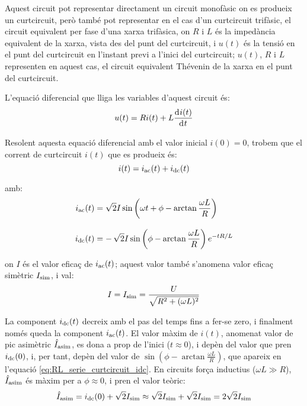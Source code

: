 Aquest circuit pot representar directament un circuit monofàsic on es produeix un curtcircuit, però també pot representar en el cas d'un curtcircuit trifàsic,  el circuit equivalent per fase d'una xarxa trifàsica, on $R$ i $L$ és la impedància equivalent de la xarxa, vista des del punt del curtcircuit, i $u(t)$ és la tensió en el punt del curtcircuit en l'instant previ a l'inici del curtcircuit; $u(t)$,  $R$ i $L$ representen en aquest cas, el circuit equivalent Thévenin de la xarxa en el punt del curtcircuit.

\begin{center}
    
    \label{pic:RL_serie_curtcircuit}
\end{center}

L'equació diferencial que lliga les variables d'aquest circuit és:
\begin{equation}
    u(t) = R i(t) + L \deriv{i(t)}{t}
\end{equation}

Resolent aquesta equació diferencial amb el valor inicial $i(0)=0$, trobem que el corrent de curtcircuit $i(t)$  que es produeix  és:
\begin{equation}
    i(t) = i_\mathrm{ac}(t) + i_\mathrm{dc}(t)
    \label{eq:RL_serie_curtcircuit_icc}
\end{equation}

amb:
\begin{subequations}
\begin{align}
    i_\mathrm{ac}(t) &= \sqrt{2} I \sin\left(\omega t + \phi - \arctan\frac{\omega L}{R}\right) \label{eq:RL_serie_curtcircuit_iac}\\[3mm]
    i_\mathrm{dc}(t) &= -\,\sqrt{2} I\sin\left(\phi - \arctan\frac{\omega L}{R}\right) e^{-t R/L}\label{eq:RL_serie_curtcircuit_idc}
\end{align}
\end{subequations}

on $I$ és el valor eficaç de $i_\mathrm{ac}(t)$; aquest valor també s'anomena valor eficaç simètric $I_\mathrm{sim}$, i val:
\begin{equation}
    I = I_\mathrm{sim} =\frac{U}{\sqrt{R^2+(\omega L)^2}}
    \label{eq:RL_serie_curtcircuit_I}
\end{equation}

La component $i_\mathrm{dc}(t)$ decreix amb el pas del temps fins a fer-se zero, i finalment només queda la component $i_\mathrm{ac}(t)$. El valor màxim de $i(t)$, anomenat valor de pic asimètric $\hat{I}_\mathrm{asim}$, es dona a prop de l'inici ($t\approx 0$), i depèn del valor que pren $i_\mathrm{dc}(0)$, i, per tant, depèn del valor de $\sin\left(\phi - \arctan\frac{\omega L}{R}\right)$, que apareix en l'equació \eqref{eq:RL_serie_curtcircuit_idc}. En circuits força inductius ($\omega L\gg R$), $\hat{I}_\mathrm{asim}$ és màxim per a $\phi \approx 0$, i pren el valor teòric:
\begin{equation}
    \hat{I}_\mathrm{asim} = i_\mathrm{dc}(0) + \sqrt{2} I_\mathrm{sim} \approx \sqrt{2} I_\mathrm{sim} +\sqrt{2} I_\mathrm{sim} =2 \sqrt{2} I_\mathrm{sim}    \label{eq:I_asim_pic}
\end{equation}


